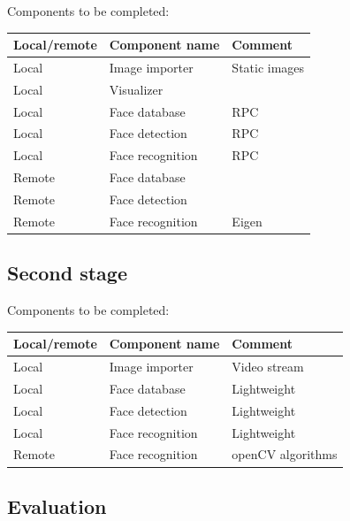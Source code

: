 \documentclass[onecolumn,conference]{IEEEtran}
\begin{document}
Components to be completed:
\begin{center}
\begin{tabular}{|l||l|l|}
	\hline
	\bf Local/remote & \bf Component name & \bf Comment \\
	\hline \hline
	Local & Image importer 	& Static images \\		\hline
	Local & Visualizer 		&  \\       \hline
	Local & Face database	& RPC \\   \hline
	Local & Face detection 	& RPC \\   \hline
	Local & Face recognition & RPC \\  \hline
	Remote & Face database	&  \\     \hline
	Remote & Face detection &  \\     \hline
	Remote & Face recognition & Eigen \\    \hline
	\hline
\end{tabular}
\end{center}


\subsection{Second stage}

Components to be completed:
\begin{center}
\begin{tabular}{|l||l|l|}
	\hline
	\bf Local/remote & \bf Component name & \bf Comment \\
	\hline \hline
	Local & Image importer 	& Video stream \\		\hline
	Local & Face database	& Lightweight \\   \hline
	Local & Face detection 	& Lightweight \\   \hline
	Local & Face recognition & Lightweight \\  \hline
	Remote & Face recognition & openCV algorithms \\    \hline
	\hline
\end{tabular}
\end{center}

\subsection{Evaluation}
\end{document}

